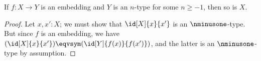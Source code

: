 %
\begin{thm}\label{thm:isntype-mono}
  If $f:X\to Y$ is an embedding and $Y$ is an $n$-type for some $n\ge -1$, then so is $X$.
\end{thm}

\begin{proof}
  Let $x,x':X$; we must show that $\id[X]{x}{x'}$ is an $\nminusone$-type.
  But since $f$ is an embedding, we have $(\id[X]{x}{x'}) \eqvsym (\id[Y]{f(x)}{f(x')})$, and the latter is an $\nminusone$-type by assumption.
\end{proof}
